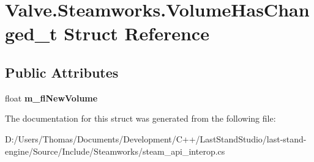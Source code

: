 \hypertarget{structValve_1_1Steamworks_1_1VolumeHasChanged__t}{}\section{Valve.\+Steamworks.\+Volume\+Has\+Changed\+\_\+t Struct Reference}
\label{structValve_1_1Steamworks_1_1VolumeHasChanged__t}
\subsection*{Public Attributes}
\begin{DoxyCompactItemize}
\item 
\hypertarget{structValve_1_1Steamworks_1_1VolumeHasChanged__t_aa070579340142068f1073a6bf6996ee6}{}float {\bfseries m\+\_\+fl\+New\+Volume}\label{structValve_1_1Steamworks_1_1VolumeHasChanged__t_aa070579340142068f1073a6bf6996ee6}

\end{DoxyCompactItemize}


The documentation for this struct was generated from the following file\+:\begin{DoxyCompactItemize}
\item 
D\+:/\+Users/\+Thomas/\+Documents/\+Development/\+C++/\+Last\+Stand\+Studio/last-\/stand-\/engine/\+Source/\+Include/\+Steamworks/steam\+\_\+api\+\_\+interop.\+cs\end{DoxyCompactItemize}
